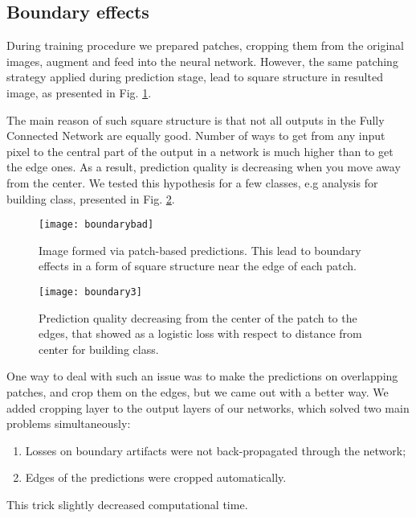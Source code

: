 \documentclass[10pt,twocolumn,letterpaper]{article}
\begin{document}
\subsection{Boundary effects}

During training procedure we prepared patches, cropping them from the original images, augment and feed into the neural network. However, the same patching strategy applied during prediction stage, lead to square structure in resulted image, as presented in Fig. \ref{fig:boundarybad}.

The main reason of such square structure is that not all outputs in the Fully Connected Network are equally good. Number of ways to get from any input pixel to the central part of the output in a network is much higher than to get the edge ones. As a result, prediction quality is decreasing when you move away from the center. We tested this hypothesis for a few classes, e.g analysis for building class, presented in Fig. \ref{fig:boundary}.

\begin{figure}[!h]
	\captionsetup{justification=centering}
	\centering
	\texttt{[image: boundarybad]}
	\caption{Image formed via patch-based predictions. This lead to boundary effects in a form of square structure near the edge of each patch.}
	\label{fig:boundarybad}
\end{figure}

\begin{figure}[!h]
	\captionsetup{justification=centering}
	\centering
	\texttt{[image: boundary3]}
	\caption{Prediction quality decreasing from the center of the patch to the edges, that showed as a logistic loss with respect to distance from center for building class.}
	\label{fig:boundary}
\end{figure}

One way to deal with such an issue was to make the predictions on overlapping patches, and crop them on the edges, but we came out with a better way. We added cropping layer to the output layers of our networks, which solved two main problems simultaneously:

\begin{enumerate}
	\item Losses on boundary artifacts were not back-propagated through the network;
	\item Edges of the predictions were cropped automatically.
\end{enumerate}

This trick slightly decreased computational time.
\end{document}
